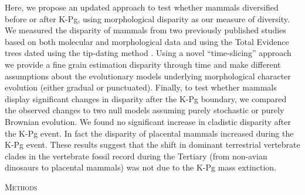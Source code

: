 \documentclass[12pt,letterpaper]{article}
\renewcommand{\section}[1]{%
\bigskip
\begin{center}
\begin{Large}
\normalfont\scshape #1
\medskip
\end{Large}
\end{center}}
\begin{document}
Here, we propose an updated approach to test whether mammals diversified before or after K-Pg, using morphological disparity as our measure of diversity.
We measured the disparity of mammals from two previously published studies \citep{Slater2012MEE,beckancient2014} based on both molecular and morphological data and using the Total Evidence trees dated using the tip-dating method \citep{ronquista2012,Wood01032013}.
Using a novel ``time-slicing'' approach we provide a fine grain estimation disparity through time and make different assumptions about the evolutionary models underlying morphological character evolution (either gradual or punctuated). 
Finally, to test whether mammals display significant changes in disparity after the K-Pg boundary, we compared the observed changes to two null models assuming purely stochastic or purely Brownian evolution. 
We found no significant increase in cladistic disparity after the K-Pg event. 
In fact the disparity of placental mammals increased during the K-Pg event. 
These results suggest that the shift in dominant terrestrial vertebrate clades in the vertebrate fossil record during the Tertiary (from non-avian dinosaurs to placental mammals) was not due to the K-Pg mass extinction.

%
%

\section{Methods}

\end{document}
